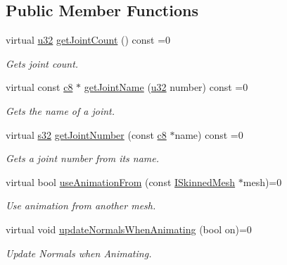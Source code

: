 \subsection*{Public Member Functions}
\begin{DoxyCompactItemize}
\item 
virtual \hyperlink{namespaceirr_a0416a53257075833e7002efd0a18e804}{u32} \hyperlink{classirr_1_1scene_1_1ISkinnedMesh_a7715fb82ffec225d2fd9b8aa860e3c38}{get\+Joint\+Count} () const =0
\begin{DoxyCompactList}\small\item\em Gets joint count. \end{DoxyCompactList}\item 
virtual const \hyperlink{namespaceirr_a9395eaea339bcb546b319e9c96bf7410}{c8} $\ast$ \hyperlink{classirr_1_1scene_1_1ISkinnedMesh_ab28aed78a7e2eeaa20ba7eb0eb082ba4}{get\+Joint\+Name} (\hyperlink{namespaceirr_a0416a53257075833e7002efd0a18e804}{u32} number) const =0
\begin{DoxyCompactList}\small\item\em Gets the name of a joint. \end{DoxyCompactList}\item 
virtual \hyperlink{namespaceirr_ac66849b7a6ed16e30ebede579f9b47c6}{s32} \hyperlink{classirr_1_1scene_1_1ISkinnedMesh_ace7288f54490d017efebe24c3eb46ab8}{get\+Joint\+Number} (const \hyperlink{namespaceirr_a9395eaea339bcb546b319e9c96bf7410}{c8} $\ast$name) const =0
\begin{DoxyCompactList}\small\item\em Gets a joint number from its name. \end{DoxyCompactList}\item 
virtual bool \hyperlink{classirr_1_1scene_1_1ISkinnedMesh_a1d7d56472adeb21aada79c361bf142be}{use\+Animation\+From} (const \hyperlink{classirr_1_1scene_1_1ISkinnedMesh}{I\+Skinned\+Mesh} $\ast$mesh)=0
\begin{DoxyCompactList}\small\item\em Use animation from another mesh. \end{DoxyCompactList}\item 
virtual void \hyperlink{classirr_1_1scene_1_1ISkinnedMesh_a19f264883a006d68b44f8b81d8ff5927}{update\+Normals\+When\+Animating} (bool on)=0
\begin{DoxyCompactList}\small\item\em Update Normals when Animating. \end{DoxyCompactList}\item 

\end{DoxyCompactItemize}
